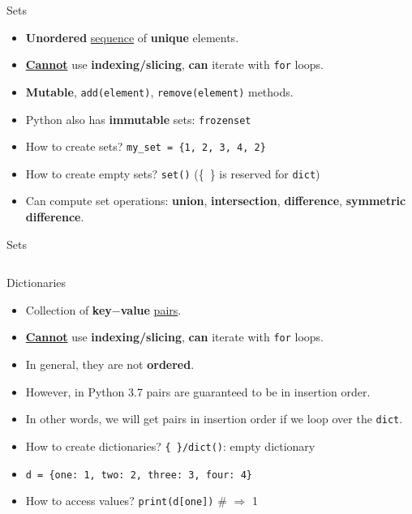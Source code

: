     \begin{frame}{Sets}
        \LARGE
        \begin{itemize}
            \item \textbf{Unordered} \underline{sequence} of \textbf{unique} elements.
            \pause
            \item \underline{\textbf{Cannot}} use \textbf{indexing/slicing}, \textbf{can} iterate with \texttt{for} loops.
            \pause
            \item \textbf{Mutable}, \texttt{add(element)}, \texttt{remove(element)} methods.
            \pause
            \item Python also has \textbf{immutable} sets: \texttt{frozenset}
            \pause
            \item How to create sets? 
            \pause
             \texttt{my\_set = \{1, 2, 3, 4, 2\}}
            \item How to create empty sets?
            \pause
             \texttt{set()} (\{\ \} is reserved for \texttt{dict})
            \pause
            \item Can compute set operations: \textbf{union}, \textbf{intersection}, \textbf{difference}, \textbf{symmetric difference}.
        \end{itemize}
    \end{frame}
    
    \begin{frame}{Sets}
        \inputminted[frame=single,framesep=2pt]{python3}{../Lecture6/code-examples/sets.py}
    \end{frame}
    

    \begin{frame}{Dictionaries}
        \Large
        \begin{itemize}
            \item Collection of \textbf{key$-$value} \underline{pairs}.
            \pause
            \item \underline{\textbf{Cannot}} use \textbf{indexing/slicing}, \textbf{can} iterate with \texttt{for} loops. 
            \pause
            \item In general, they are not \textbf{ordered}. 
            \pause
            \item However, in Python 3.7 pairs are guaranteed to be in insertion order.
            \pause
            \item In other words, we will get pairs in insertion order if we loop over the \texttt{dict}.
            \pause
            \item How to create dictionaries?
            \pause
             \texttt{\{\ \}/dict()}: empty dictionary
            \pause
            \item \texttt{d = \{\textquotesingle one\textquotesingle : 1, \textquotesingle two\textquotesingle : 2, \textquotesingle three\textquotesingle : 3, \textquotesingle four\textquotesingle : 4\}}
            \pause
            \item How to access values? 
            \pause
             \texttt{print(d[\textquotesingle one\textquotesingle ])} \# $\Rightarrow$ 1
        \end{itemize}
    \end{frame}

